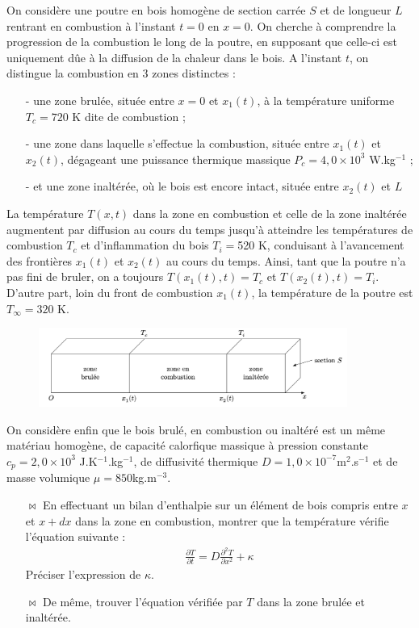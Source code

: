 \documentclass{report}
\begin{document}
On considère une poutre en bois homogène de section carrée $S$ et de longueur $L$ rentrant en combustion à l'instant $t=0$ en $x=0$. On cherche à comprendre la progression de la combustion le long de la poutre, en supposant que celle-ci est uniquement dûe à la diffusion de la chaleur dans le bois. 
A l'instant $t$, on distingue la combustion en 3 zones distinctes :
\begin{itemize}
	\item[-] une zone brulée, située entre $x=0$ et $x_1(t)$, à la température uniforme $T_c=720$ K dite de combustion ;
	\item[-] une zone dans laquelle s'effectue la combustion, située entre $x_1(t)$ et $x_2(t)$, dégageant une puissance thermique massique $P_c=4,0\times10^3$ W.kg$^{-1}$ ;
	\item[-] et une zone inaltérée, où le bois est encore intact, située entre $x_2(t)$ et $L$
\end{itemize}
La température $T(x,t)$ dans la zone en combustion et celle de la zone inaltérée augmentent par diffusion au cours du temps jusqu’à atteindre les températures de combustion $T_c$ et d’inflammation du bois $T_i=$520 K, conduisant à l’avancement des frontières $x_1(t)$ et $x_2(t)$ au cours du temps. Ainsi, tant que la poutre n’a pas fini de bruler, on a toujours $T(x_1(t),t)=T_c$ et $T(x_2(t),t)=T_i$. D'autre part, loin du front de combustion $x_1(t)$, la température de la poutre est $T_\infty=320$ K.

\begin{figure}[h!]
\centering
  \includegraphics[width=0.9\textwidth]{poutre.png}
\end{figure}

On considère enfin que le bois brulé, en combustion ou inaltéré est un même matériau homogène, de capacité calorfique massique à pression constante $c_p=2,0\times10^3$ J.K$^{-1}$.kg$^{-1}$, de diffusivité thermique $D=1,0\times10^{-7}$m$^2$.s$^{-1}$ et de masse volumique $\mu=850$kg.m$^{-3}$.

\begin{itemize}

	\item[$\Join$] En effectuant un bilan d'enthalpie sur un élément de bois compris entre $x$ et $x+dx$ dans la zone en combustion, montrer que la température vérifie l'équation suivante :
	\begin{align*}
		\frac{\partial T}{\partial t}=D\frac{\partial^2 T}{\partial x^2} + \kappa
	\end{align*}
	Préciser l'expression de $\kappa$.
	\item[$\Join$] De même, trouver l'équation vérifiée par $T$ dans la zone brulée et inaltérée. 

\end{itemize}
\end{document}
